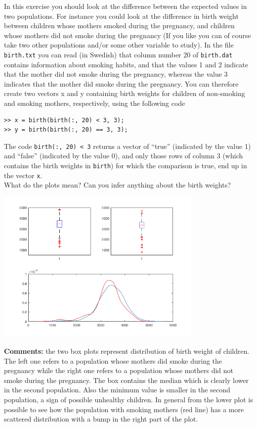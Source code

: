 \documentclass[letterpaper,12pt]{article}
\begin{document}
In this exercise you should look at the difference between the expected values in two populations. For instance you could look at the difference in birth weight between children whose mothers smoked during the pregnancy, and children whose mothers did not smoke during the pregnancy (If you like you can of course take two other populations and/or some other variable to study). In the file \texttt{birth.txt} you can read (in Swedish) that column number 20 of \texttt{birth.dat} contains information about smoking habits, and that the values 1 and 2 indicate that the mother did not smoke during the pregnancy, whereas the value 3 indicates that the mother did smoke during the pregnancy. You can therefore create two vectors x and y containing birth weights for children of non-smoking and smoking mothers, respectively, using the following code
\begin{verbatim}
>> x = birth(birth(:, 20) < 3, 3);
>> y = birth(birth(:, 20) == 3, 3);
\end{verbatim}
The code \texttt{birth(:, 20) < 3} returns a vector of “true” (indicated by the value 1) and “false” (indicated by the value 0), and only those rows of column 3 (which contains the birth weights in \texttt{birth}) for which the comparison is true, end up in the vector \texttt{x}.\\
What do the plots mean? Can you infer anything about the birth weights?

{\centering
  \includegraphics[width=10cm]{img/pb_5.png}\par
}

\begin{tcolorbox}
\textbf{Comments:}
the two box plots represent distribution of birth weight of children. The left one refers to a population whose mothers did smoke during the pregnancy while the right one refers to a population whose mothers did not smoke during the pregnancy. The box contains the median which is clearly lower in the second population. Also the minimum value is smaller in the second population, a sign of possible unhealthy children. In general from the lower plot is possible to see how the population with smoking mothers (red line) has a more scattered distribution with a bump in the right part of the plot.
\end{tcolorbox}
\end{document}
